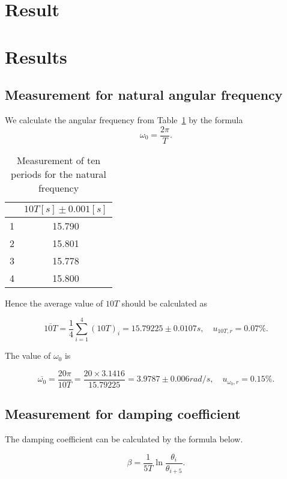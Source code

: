 \section{Result}

\section{Results}

\subsection{Measurement for natural angular frequency}
We calculate the angular frequency from Table~\ref{data_omega} by the formula
\[
\omega_0=\frac{2\pi}{T}.
\]
\begin{table}[H] \small
\centering
\begin{tabular}{|c|c|}
\hline
& $10T[s] \pm 0.001[s]$\\\hline
1 & 15.790  \\\hline
2 & 15.801  \\\hline
3 & 15.778  \\\hline
4 & 15.800  \\\hline
\end{tabular}
\caption{Measurement of ten periods for the natural frequency}
\label{data_omega}
\end{table}

Hence the average value of $10T$ should be calculated as

\[
\overline{10T}=\frac{1}{4}\sum_{i=1}^{4}(10T)_i=15.79225 \pm 0.0107 s, \quad u_{10T,r}=0.07\%.
\]

The value of $\omega_0$ is

\[
\overline{\omega_0}=\frac{20\pi}{10T}=\frac{20\times3.1416}{15.79225}= 3.9787 \pm 0.006 rad/s,\quad u_{\omega_0,r}=0.15\%.
\]

\subsection{Measurement for damping coefficient}

The damping coefficient can be calculated by the formula below.

\[
\beta=\frac{1}{5T}\ln\frac{\theta_i}{\theta_{i+5}}.
\]

